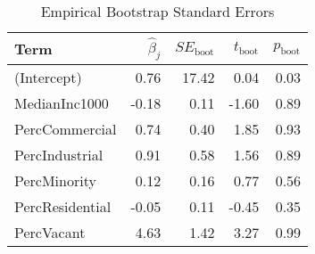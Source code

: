 \begin{table}[ht]
\centering
\begin{tabular}{lrrrr}
  \hline
Term & $\widehat{\beta}_{j}$ & $SE_{\text{boot}}$ & $t_{\text{boot}}$ & $p_{\text{boot}}$ \\ 
  \hline
(Intercept) & 0.76 & 17.42 & 0.04 & 0.03 \\ 
  MedianInc1000 & -0.18 & 0.11 & -1.60 & 0.89 \\ 
  PercCommercial & 0.74 & 0.40 & 1.85 & 0.93 \\ 
  PercIndustrial & 0.91 & 0.58 & 1.56 & 0.89 \\ 
  PercMinority & 0.12 & 0.16 & 0.77 & 0.56 \\ 
  PercResidential & -0.05 & 0.11 & -0.45 & 0.35 \\ 
  PercVacant & 4.63 & 1.42 & 3.27 & 0.99 \\ 
   \hline
\end{tabular}
\caption{Empirical Bootstrap Standard Errors} 
\end{table}
